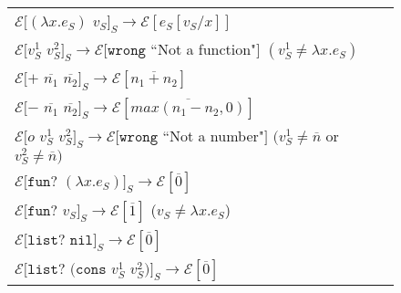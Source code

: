 \begin{figure}[p]
\centering
\begin{tabular}{l}
\vspace{5pt}

$\mathscr{E}[(\lambda x.e_{S})$ $v_{S}]_{S}\rightarrow\mathscr{E}[e_{S}[v_{S}/x]]$ \\

\vspace{5pt}

$\mathscr{E}[v_{S}^{1}$ $v_{S}^{2}]_{S}\rightarrow\mathscr{E}[\mathtt{wrong}$ ``Not a function"$]$ $(v_{S}^{1}\neq\lambda x.e_{S})$ \\

\vspace{5pt}

$\mathscr{E}[+$ $\overline{n_{1}}$ $\overline{n_{2}}]_{S}\rightarrow\mathscr{E}[\overline{n_{1}+n_{2}}]$ \\

\vspace{5pt}

$\mathscr{E}[-$ $\overline{n_{1}}$ $\overline{n_{2}}]_{S}\rightarrow\mathscr{E}[\overline{max(n_{1}-n_{2},0)}]$ \\

\vspace{5pt}

$\mathscr{E}[o$ $v_{S}^{1}$ $v_{S}^{2}]_{S}\rightarrow\mathscr{E}[\mathtt{wrong}$ ``Not a number"$]$ $(v_{S}^{1}\neq\overline{n}$ or $v_{S}^{2}\neq\overline{n})$ \\

\vspace{5pt}

$\mathscr{E}[\mathtt{fun?}$ $(\lambda x.e_{S})]_{S}\rightarrow\mathscr{E}[\overline{0}]$ \\

\vspace{5pt}

$\mathscr{E}[\mathtt{fun?}$ $v_{S}]_{S}\rightarrow\mathscr{E}[\overline{1}]$ ($v_{S}\neq\lambda x.e_{S}$) \\

\vspace{5pt}

$\mathscr{E}[\mathtt{list?}$ $\mathtt{nil}]_{S}\rightarrow\mathscr{E}[\overline{0}]$ \\

\vspace{5pt}

$\mathscr{E}[\mathtt{list?}$ $(\mathtt{cons}$ $v_{S}^{1}$ $v_{S}^{2})]_{S}\rightarrow\mathscr{E}[\overline{0}]$ \\


\end{tabular}
\end{figure}
